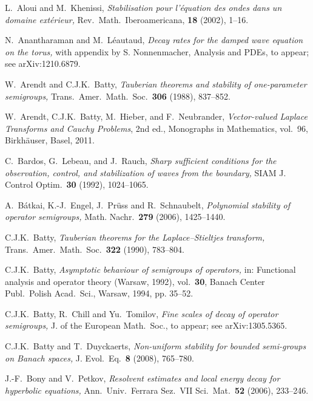 \documentclass[11pt]{amsart}
\theoremstyle{definition}
\theoremstyle{remark}
\numberwithin{equation}{section}
\begin{document}
\begin{thebibliography}{100}

 L.~Aloui and M.~Khenissi, \emph{Stabilisation pour l'\'equation des ondes dans un domaine ext\'erieur,} Rev.\ Math.\ Iberoamericana, \textbf{18} (2002), 1--16.

 N.~Anantharaman and M.~L\'eautaud, \emph{Decay rates for the damped wave equation on the torus,}
with appendix by S. Nonnenmacher, Analysis and PDEs, to appear;
see arXiv:1210.6879.

 W.~Arendt and C.J.K.~Batty, \emph{ Tauberian theorems and
stability of one-parameter semigroups,} Trans.\ Amer.\ Math.\ Soc.\ \textbf{306} (1988), 837--852.

 W.~Arendt, C.J.K.~Batty, M.~Hieber, and F.~Neubrander, \emph{Vector-valued Laplace Transforms and Cauchy Problems}, 2nd ed., Monographs in Mathematics, vol.~96, Birkh\"auser, Basel, 2011.

 C.~Bardos, G.~Lebeau, and J.~Rauch, \emph{Sharp sufficient conditions for the observation, control, and stabilization of waves from the boundary,}
SIAM J. Control Optim.\ \textbf{30} (1992), 1024--1065.

 A.~B\' atkai, K.-J.~Engel, J.~Pr\" uss and R.~Schnaubelt, \emph{Polynomial stability of operator semigroups,} Math. Nachr.\ \textbf{279}
(2006), 1425--1440.

 C.J.K.~Batty, \emph{Tauberian theorems for the Laplace--Stieltjes transform,} Trans.\ Amer.\ Math.\ Soc.\ \textbf{322} (1990), 783--804.

 C.J.K.~Batty, \emph{ Asymptotic behaviour of semigroups of operators,} in: Functional analysis and operator theory (Warsaw, 1992), vol.\ \textbf{30}, Banach Center Publ.\ Polish Acad.\ Sci., Warsaw, 1994, pp. 35--52.

 C.J.K.~Batty, R.~Chill and Yu.~Tomilov, \emph{Fine scales of decay of operator semigroups,} J. of the European Math.\ Soc., to appear; see arXiv:1305.5365.

 C.J.K.~Batty and T.~Duyckaerts, \emph{Non-uniform stability for bounded semi-groups on Banach spaces,} J. Evol.\ Eq.\ \textbf{8} (2008), 765--780.

 J.-F.~Bony and V.~Petkov, \emph{Resolvent estimates and local energy decay for hyperbolic equations,} Ann.\ Univ.\ Ferrara Sez.\ VII Sci.\ Mat.\ \textbf{52} (2006), 233--246.


\end{thebibliography}
\end{document}
